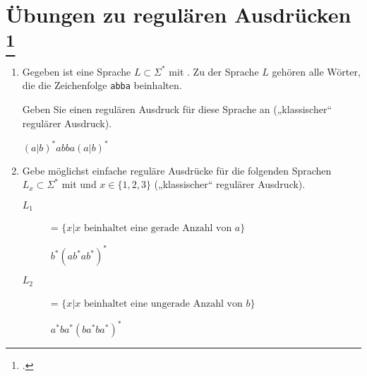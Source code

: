 \documentclass{bschlangaul-aufgabe}
\begin{document}
\section{Übungen zu regulären Ausdrücken
\footcite[Seite 21]{theo:fs:1}}

\begin{enumerate}

%

\item Gegeben ist eine Sprache $L \subset \Sigma^*$ mit
. Zu der Sprache $L$ gehören alle Wörter, die die
Zeichenfolge \texttt{abba} beinhalten.

Geben Sie einen regulären Ausdruck für diese Sprache an („klassischer“
regulärer Ausdruck).

\begin{liAntwort}
$(a|b)^*abba(a|b)^*$

\end{liAntwort}

%

\item Gebe möglichst einfache reguläre Ausdrücke für die folgenden
Sprachen $L_x \subset \Sigma^*$ mit  und $x \in \{1, 2, 3\}$ („klassischer“ regulärer Ausdruck).

\begin{description}

%

\item[$L_1$] = $\{ x | x \text{ beinhaltet eine gerade Anzahl von } a \}$

\begin{liAntwort}
$b^*(ab^*ab^*)^*$

\end{liAntwort}

%

\item[$L_2$] = $\{ x | x \text{ beinhaltet eine ungerade Anzahl von } b \}$

\begin{liAntwort}
$a^*ba^*(ba^*ba^*)^*$

\end{liAntwort}


\end{description}
\end{enumerate}
\end{document}
